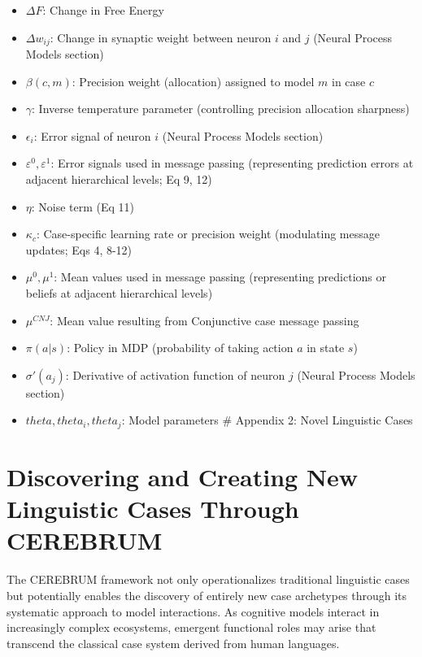 \begin{itemize}
\item
  \(\Delta F\): Change in Free Energy
\item
  \(\Delta w_{ij}\): Change in synaptic weight between neuron \(i\) and
  \(j\) (Neural Process Models section)
\item
  \(\beta(c,m)\): Precision weight (allocation) assigned to model \(m\)
  in case \(c\)
\item
  \(\gamma\): Inverse temperature parameter (controlling precision
  allocation sharpness)
\item
  \(\epsilon_i\): Error signal of neuron \(i\) (Neural Process Models
  section)
\item
  \(\varepsilon^0, \varepsilon^1\): Error signals used in message
  passing (representing prediction errors at adjacent hierarchical
  levels; Eq 9, 12)
\item
  \(\eta\): Noise term (Eq 11)
\item
  \(\kappa_c\): Case-specific learning rate or precision weight
  (modulating message updates; Eqs 4, 8-12)
\item
  \(\mu^0, \mu^1\): Mean values used in message passing (representing
  predictions or beliefs at adjacent hierarchical levels)
\item
  \(\mu^{CNJ}\): Mean value resulting from Conjunctive case message
  passing
\item
  \(\pi(a|s)\): Policy in MDP (probability of taking action \(a\) in
  state \(s\))
\item
  \(\sigma'(a_j)\): Derivative of activation function of neuron \(j\)
  (Neural Process Models section)
\item
  \(theta, theta_i, theta_j\): Model parameters \# Appendix 2: Novel
  Linguistic Cases
\end{itemize}

\hypertarget{discovering-and-creating-new-linguistic-cases-through-cerebrum}{%
\section{Discovering and Creating New Linguistic Cases Through
CEREBRUM}\label{discovering-and-creating-new-linguistic-cases-through-cerebrum}}

The CEREBRUM framework not only operationalizes traditional linguistic
cases but potentially enables the discovery of entirely new case
archetypes through its systematic approach to model interactions. As
cognitive models interact in increasingly complex ecosystems, emergent
functional roles may arise that transcend the classical case system
derived from human languages.

